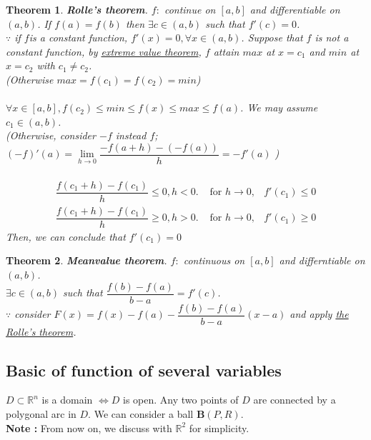\documentclass[a4paper,10pt]{article}
\newtheorem{theo}{Theorem}
\newcommand{\R}{\mathbb{R}}
\begin{document}
\begin{theo}
	\textbf{Rolle's theorem}. $ f :$ continue on $ [a,b] $ and differentiable on $ (a,b) $. If $ f(a)=f(b) $ then $ \exists c \in (a,b) $ such that $ f\prime (c)=0 $.\\
	$ \because $ if $ f $is a constant function, $ f\prime(x)=0, \forall x\in (a,b) $. Suppose that $ f $ is not a constant function, by \underline{extreme value theorem}, $ f $ attain $ max $ at $ x=c_{1} $ and $ min $ at $ x=c_{2} $ with $ c_{1} \neq c_{2} $. \\
	(Otherwise $ max=f(c_{1}) = f(c_{2}) = min $)\\ \\
	$ \forall x\in [a,b], f(c_{2}) \leq min \leq f(x) \leq max \leq f(a) $. We may assume $ c_{1} \in (a,b) $.\\
	(Otherwise, consider $ -f $ instead $ f $; $ (-f)\prime(a) =\lim\limits_{h\rightarrow 0} \dfrac{-f(a+h)-(-f(a))}{h} = -f\prime(a) $ )\\ \\
	\begin{eqnarray}\nonumber
	\dfrac{f(c_{1}+h)-f(c_{1})}{h} \leq 0, h<0. & \text{ for } h \rightarrow 0 ,& f\prime(c_{1}) \leq 0 \\ \nonumber
	\dfrac{f(c_{1}+h)-f(c_{1})}{h} \geq 0, h>0. & \text{ for } h \rightarrow 0 ,& f\prime(c_{1}) \geq 0
	\end{eqnarray}
	Then, we can conclude that $ f\prime(c_{1}) = 0 $
\end{theo}

\begin{theo}
	\textbf{Meanvalue theorem}. $ f : $ continuous on $ [a,b] $ and differntiable on $ (a,b) $.\\
	$ \exists c \in (a,b) $ such that $ \dfrac{f(b)-f(a)}{b-a} = f\prime (c) $.\\
	$ \because $ consider $ F(x) = f(x) - f(a) - \dfrac{f(b)-f(a)}{b-a}(x-a) $ and apply \underline{the Rolle's theorem}.
\end{theo}

\subsection{Basic of function of several variables}
$ D \subset \R^n $ is a domain $ \Leftrightarrow D $ is open. Any two points of $ D $ are connected by a polygonal arc in $ D $. We can consider a ball $ \textbf{B}(P,R) $.\\
\textbf{Note :} From now on, we discuss with $ \R^2 $ for simplicity.
\end{document}
